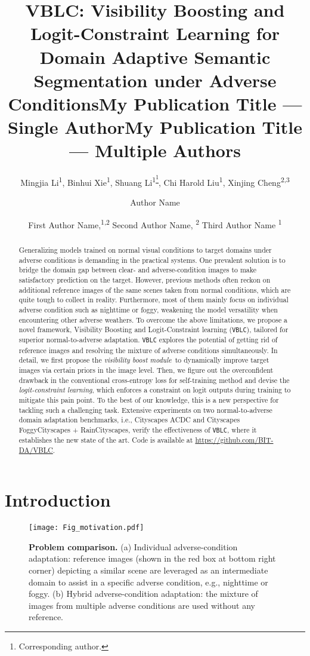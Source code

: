 \documentclass[letterpaper]{article} \usepackage{aaai23}  \usepackage{times}  \usepackage{helvet}  \usepackage{courier}  \usepackage[hyphens]{url}  \usepackage{graphicx} \urlstyle{rm} \def\UrlFont{\rm}  \usepackage{natbib}  \usepackage{caption} \frenchspacing  \setlength{\pdfpagewidth}{8.5in}  \setlength{\pdfpageheight}{11in}  \usepackage{algorithm}
\title{VBLC: Visibility Boosting and Logit-Constraint Learning for \\Domain Adaptive Semantic Segmentation under Adverse Conditions}
\author{
Mingjia Li\textsuperscript{\rm 1\equalcontrib}, Binhui Xie\textsuperscript{\rm 1\equalcontrib}, Shuang Li\textsuperscript{\rm 1\thanks{Corresponding author.}}, Chi Harold Liu\textsuperscript{\rm 1}, Xinjing Cheng\textsuperscript{\rm 2,\rm 3}
}
\title{My Publication Title --- Single Author}
\author {
    Author Name
}
\title{My Publication Title --- Multiple Authors}
\author {
First Author Name,\textsuperscript{\rm 1,\rm 2}
    Second Author Name, \textsuperscript{\rm 2}
    Third Author Name \textsuperscript{\rm 1}
}
\newcommand{\methodblank}{\texttt{VBLC}}
\newcommand{\boostModuleName}{\textit{visibility boost module}}
\newcommand{\lossModuleName}{\textit{logit-constraint learning}}
\begin{document}
\maketitle

\begin{abstract}
    Generalizing models trained on normal visual conditions to target domains under adverse conditions is demanding in the practical systems. One prevalent solution is to bridge the domain gap between clear- and adverse-condition images to make satisfactory prediction on the target. However, previous methods often reckon on additional reference images of the same scenes taken from normal conditions, which are quite tough to collect in reality. Furthermore, most of them mainly focus on individual adverse condition such as nighttime or foggy, weakening the model versatility when encountering other adverse weathers. To overcome the above limitations, we propose a novel framework, Visibility Boosting and Logit-Constraint learning (\texttt{VBLC}), tailored for superior normal-to-adverse adaptation. \texttt{VBLC} explores the potential of getting rid of reference images and resolving the mixture of adverse conditions simultaneously. In detail, we first propose the \boostModuleName~to dynamically improve target images via certain priors in the image level. Then, we figure out the overconfident drawback in the conventional cross-entropy loss for self-training method and devise the \lossModuleName, which enforces a constraint on logit outputs during training to mitigate this pain point. To the best of our knowledge, this is a new perspective for tackling such a challenging task. Extensive experiments on two normal-to-adverse domain adaptation benchmarks, i.e., Cityscapes  ACDC and Cityscapes  FoggyCityscapes + RainCityscapes, verify the effectiveness of \methodblank, where it establishes the new state of the art. Code is available at \url{https://github.com/BIT-DA/VBLC}.
\end{abstract}

\section{Introduction}

\begin{figure}[t]
    \centering
    \texttt{[image: Fig\_motivation.pdf]}
    \caption{{\bf Problem comparison.} (a) Individual adverse-condition adaptation: reference images (shown in the red box at bottom right corner) depicting a similar scene are leveraged as an intermediate domain to assist in a specific adverse condition, e.g., nighttime or foggy. (b) Hybrid adverse-condition adaptation: the mixture of images from multiple adverse conditions are used without any reference.}
    \label{fig:motivation}
\end{figure}
\end{document}
